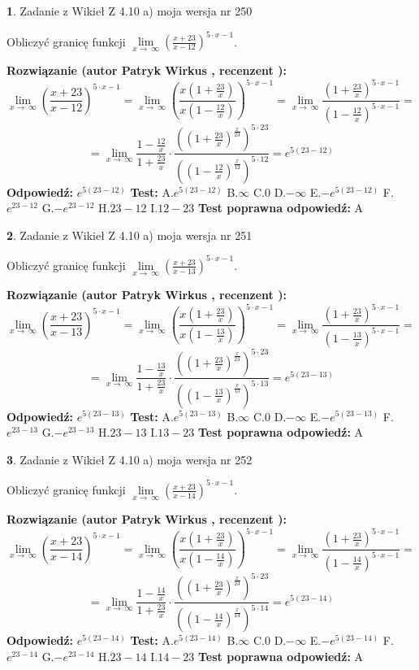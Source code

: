 \documentclass[12pt, a4paper]{article}
\theoremstyle{definition} %
\newtheorem{zad}{}
\newcommand{\zadStart}[1]{\begin{zad}#1\newline}
\newcommand{\zadStop}{\end{zad}}
\newcommand{\rozwStart}[2]{\noindent \textbf{Rozwiązanie (autor #1 , recenzent #2): }\newline}
\newcommand{\rozwStop}{\newline}
\newcommand{\odpStart}{\noindent \textbf{Odpowiedź:}\newline}
\newcommand{\odpStop}{\newline}
\newcommand{\testStart}{\noindent \textbf{Test:}\newline}
\newcommand{\testStop}{\newline}
\newcommand{\kluczStart}{\noindent \textbf{Test poprawna odpowiedź:}\newline}
\newcommand{\kluczStop}{\newline}
\begin{document}
\zadStart{Zadanie z Wikieł Z 4.10 a) moja wersja nr 250}


Obliczyć granicę funkcji  $\lim\limits_{x\to\ \infty}(\frac{x+23}{x-12})^{5\cdot x-1}$.
\zadStop
\rozwStart{Patryk Wirkus}{}
$$\lim\limits_{x\to\ \infty}(\frac{x+23}{x-12})^{5\cdot x-1} = \lim\limits_{x\to\ \infty}(\frac{x(1+\frac{23}{x})}{x(1-\frac{12}{x})})^{5\cdot x-1}=\lim\limits_{x\to\ \infty}\frac{(1+\frac{23}{x})^{5\cdot x-1}}{(1-\frac{12}{x})^{5\cdot x-1}}=$$
$$=\lim\limits_{x\to\ \infty}\frac{1-\frac{12}{x}}{1+\frac{23}{x}}\cdot\frac{((1+\frac{23}{x})^{\frac{x}{23}})^{5\cdot23}}{((1-\frac{12}{x})^{\frac{x}{12}})^{5\cdot12}}=e^{5(23-12)}$$
\rozwStop
\odpStart
$e^{5(23-12)}$
\odpStop
\testStart
A.$e^{5(23-12)}$ B.$\infty$ C.$0$ D.$-\infty$ E.$-e^{5(23-12)}$
F.$e^{23-12}$ G.$-e^{23-12}$
H.$23-12$
I.$12-23$
\testStop
\kluczStart
A
\kluczStop



\zadStart{Zadanie z Wikieł Z 4.10 a) moja wersja nr 251}


Obliczyć granicę funkcji  $\lim\limits_{x\to\ \infty}(\frac{x+23}{x-13})^{5\cdot x-1}$.
\zadStop
\rozwStart{Patryk Wirkus}{}
$$\lim\limits_{x\to\ \infty}(\frac{x+23}{x-13})^{5\cdot x-1} = \lim\limits_{x\to\ \infty}(\frac{x(1+\frac{23}{x})}{x(1-\frac{13}{x})})^{5\cdot x-1}=\lim\limits_{x\to\ \infty}\frac{(1+\frac{23}{x})^{5\cdot x-1}}{(1-\frac{13}{x})^{5\cdot x-1}}=$$
$$=\lim\limits_{x\to\ \infty}\frac{1-\frac{13}{x}}{1+\frac{23}{x}}\cdot\frac{((1+\frac{23}{x})^{\frac{x}{23}})^{5\cdot23}}{((1-\frac{13}{x})^{\frac{x}{13}})^{5\cdot13}}=e^{5(23-13)}$$
\rozwStop
\odpStart
$e^{5(23-13)}$
\odpStop
\testStart
A.$e^{5(23-13)}$ B.$\infty$ C.$0$ D.$-\infty$ E.$-e^{5(23-13)}$
F.$e^{23-13}$ G.$-e^{23-13}$
H.$23-13$
I.$13-23$
\testStop
\kluczStart
A
\kluczStop



\zadStart{Zadanie z Wikieł Z 4.10 a) moja wersja nr 252}


Obliczyć granicę funkcji  $\lim\limits_{x\to\ \infty}(\frac{x+23}{x-14})^{5\cdot x-1}$.
\zadStop
\rozwStart{Patryk Wirkus}{}
$$\lim\limits_{x\to\ \infty}(\frac{x+23}{x-14})^{5\cdot x-1} = \lim\limits_{x\to\ \infty}(\frac{x(1+\frac{23}{x})}{x(1-\frac{14}{x})})^{5\cdot x-1}=\lim\limits_{x\to\ \infty}\frac{(1+\frac{23}{x})^{5\cdot x-1}}{(1-\frac{14}{x})^{5\cdot x-1}}=$$
$$=\lim\limits_{x\to\ \infty}\frac{1-\frac{14}{x}}{1+\frac{23}{x}}\cdot\frac{((1+\frac{23}{x})^{\frac{x}{23}})^{5\cdot23}}{((1-\frac{14}{x})^{\frac{x}{14}})^{5\cdot14}}=e^{5(23-14)}$$
\rozwStop
\odpStart
$e^{5(23-14)}$
\odpStop
\testStart
A.$e^{5(23-14)}$ B.$\infty$ C.$0$ D.$-\infty$ E.$-e^{5(23-14)}$
F.$e^{23-14}$ G.$-e^{23-14}$
H.$23-14$
I.$14-23$
\testStop
\kluczStart
A
\kluczStop
\end{document}
